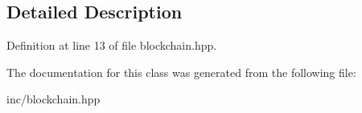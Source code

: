 \subsection{Detailed Description}


Definition at line 13 of file blockchain.\+hpp.



The documentation for this class was generated from the following file\+:\begin{DoxyCompactItemize}
\item 
inc/blockchain.\+hpp\end{DoxyCompactItemize}

